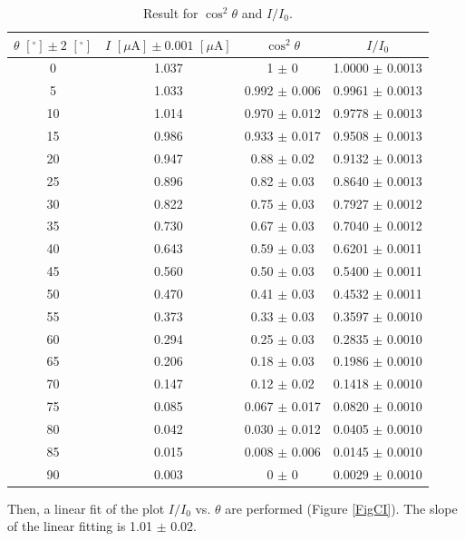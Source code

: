 \documentclass{article}
\begin{document}
\begin{table}[H]\centering
\begin{tabular}{cccc}
\toprule
$\theta\,\,[^\circ] \pm 2\,\,[^\circ]$ & $I\,\,[\mu\text{A}] \pm 0.001\,\,[\mu\text{A}]$ & $\cos^2\theta$ & $I/I_0$\\
\midrule
    0     & 1.037 & 1     $\pm$ 0     & 1.0000 $\pm$ 0.0013 \\
    5     & 1.033 & 0.992 $\pm$ 0.006 & 0.9961 $\pm$ 0.0013 \\
    10    & 1.014 & 0.970 $\pm$ 0.012 & 0.9778 $\pm$ 0.0013 \\
    15    & 0.986 & 0.933 $\pm$ 0.017 & 0.9508 $\pm$ 0.0013 \\
    20    & 0.947 & 0.88  $\pm$ 0.02  & 0.9132 $\pm$ 0.0013 \\
    25    & 0.896 & 0.82  $\pm$ 0.03  & 0.8640 $\pm$ 0.0013 \\
    30    & 0.822 & 0.75  $\pm$ 0.03  & 0.7927 $\pm$ 0.0012 \\
    35    & 0.730 & 0.67  $\pm$ 0.03  & 0.7040 $\pm$ 0.0012 \\
    40    & 0.643 & 0.59  $\pm$ 0.03  & 0.6201 $\pm$ 0.0011 \\
    45    & 0.560 & 0.50  $\pm$ 0.03  & 0.5400 $\pm$ 0.0011 \\
    50    & 0.470 & 0.41  $\pm$ 0.03  & 0.4532 $\pm$ 0.0011 \\
    55    & 0.373 & 0.33  $\pm$ 0.03  & 0.3597 $\pm$ 0.0010 \\
    60    & 0.294 & 0.25  $\pm$ 0.03  & 0.2835 $\pm$ 0.0010 \\
    65    & 0.206 & 0.18  $\pm$ 0.03  & 0.1986 $\pm$ 0.0010 \\
    70    & 0.147 & 0.12  $\pm$ 0.02  & 0.1418 $\pm$ 0.0010 \\
    75    & 0.085 & 0.067 $\pm$ 0.017 & 0.0820 $\pm$ 0.0010 \\
    80    & 0.042 & 0.030 $\pm$ 0.012 & 0.0405 $\pm$ 0.0010 \\
    85    & 0.015 & 0.008 $\pm$ 0.006 & 0.0145 $\pm$ 0.0010 \\
    90    & 0.003 & 0     $\pm$ 0     & 0.0029 $\pm$ 0.0010 \\
\bottomrule
\end{tabular}
\caption{Result for $\cos^2\theta$ and $I/I_0$.}\label{TableCI2}
\end{table}

Then, a linear fit of the plot $I/I_0$ vs. $\theta$ are performed (Figure \ref{FigCI}). The slope of the linear fitting is 1.01 $\pm$ 0.02.
\end{document}
